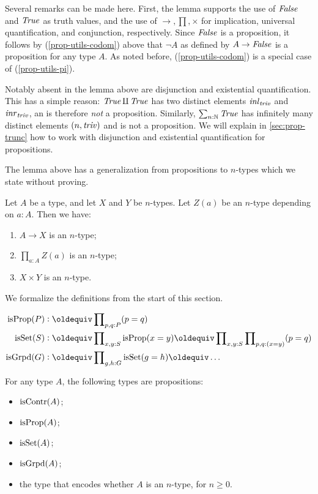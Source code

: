 Several remarks can be made here. First, the lemma supports the
use of $\mathop{\mathit{False}}$ and $\mathop{\mathit{True}}$ as truth values, and the use of
$\to,\prod,\times$ for implication, universal quantification,
and conjunction, respectively. Since $\mathop{\mathit{False}}$ is a proposition,
it follows by (\ref{prop-utils-codom}) above that
$\neg A$ as defined by $A\to\mathop{\mathit{False}}$ is a proposition for any type $A$.
As noted before, (\ref{prop-utils-codom}) is a
special case of (\ref{prop-utils-pi}).

Notably absent in the lemma above are disjunction
and existential quantification. This has a simple reason:
$\mathop{\mathit{True}}\amalg \mathop{\mathit{True}}$ has two distinct elements
$\mathop{{\it inl}_{\mathop{\mathit{triv}}}}$ and $\mathop{{\it inr}_{\mathop{\mathit{triv}}}}$, an is therefore \emph{not} a proposition.
Similarly, $\sum_{n:\mathbb{N}} \mathop{\mathit{True}}$ has infinitely many
distinct elements $(n,\mathop{\mathit{triv}})$ and is not a proposition. We will explain 
in \cref{sec:prop-trunc} how to work with disjunction and 
existential quantification for propositions.

The lemma above has a generalization from propositions to
$n$-types which we state without proving.

\begin{lemma}\label{lem:level-n-utils}
Let $A$ be a type, and let $X$ and $Y$ be $n$-types.
Let $Z(a)$ be an $n$-type depending on $a:A$. Then we have:

\begin{enumerate}
\item\label{level-n-utils-codom} $A\to X$ is an $n$-type;
\item\label{level-n-utils-pi} $\prod_{a:A} Z(a)$ is an $n$-type;
\item\label{level-n-utils-times} $X\times Y$ is an $n$-type.
\end{enumerate}
\end{lemma}

We formalize the definitions from the start of this section.
\begin{definition}\label{def:isSet}
\begin{align*}
\isprop(P) &\defeq\prod\nolimits_{p,q:P}(p=q)\\
\isset(S) &\defeq\prod\nolimits_{x,y:S}\isprop(x=y)\jdeq
                  \prod\nolimits_{x,y:S}\prod\nolimits_{p,q:(x=y)}(p=q)\\
\isgrpd(G) &\defeq\prod\nolimits_{g,h:G}\isset(g=h)\jdeq \ldots\\
\end{align*}
\end{definition}

\begin{lemma}\label{lem:isX-is-prop}
  For any type $A$, the following types are propositions:
  \begin{itemize}
    \item $\mathrm{isContr}(A)$;
    \item $\mathrm{isProp}(A)$;
    \item $\mathrm{isSet}(A)$;
    \item $\mathrm{isGrpd}(A)$;
    \item the type that encodes whether $A$ is an $n$-type, for $n \ge 0$.
  \end{itemize}
\end{lemma}

